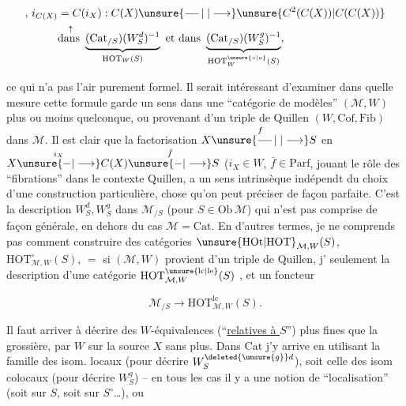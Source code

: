 \[
\begin{aligned}
,\,i_{C(X)}&=C(i_X):C(X)\unsure{\mathrel{\relbar\joinrel\relbar\joinrel\vert}|\longrightarrow}\unsure{C^2(C(X))|C(C(X))}\\
&\overset{\uparrow}{\text{dans }}\underbrace{(\mathrm{Cat}_{/S})(W_S^d)^{-1}}_{\mathrm{HOT}_W(S)}
 \text{ et dans }\underbrace{(\mathrm{Cat}_{/S})(W_S^g)^{-1}}_{\mathrm{HOT}_W^{\unsure{\circ|o}}(S)},
\end{aligned}
\]

ce qui n'a pas l'air purement formel.  Il serait intéressant d'examiner dans quelle mesure   cette formule garde un sens  dans une ``catégorie de modèles'' $(\mathcal M,W)$ plus ou moins quelconque,  ou provenant d'un triple de Quillen $(W,\mathrm{Cof},\mathrm{Fib})$ dans $\mathcal M$. Il est clair que la factorisation $X\overset{f}{\unsure{\mathrel{\relbar\joinrel\relbar\joinrel\vert}|\longrightarrow}}S$ en $X\overset{i_X}{\unsure{-|\longrightarrow}}C(X)\overset{\bar f}{\unsure{-|\longrightarrow}}S$ ($i_X\in W$, $\bar f\in\mathrm{Parf}$, jouant le rôle des ``fibrations'' dans le contexte Quillen, a un sens intrinsèque indépendt du choix d'une construction particulière, chose qu'on peut préciser de façon parfaite. C'est la  description  $W_S^d,W_S^g$ dans $\mathcal M_{/S}$ (pour $S\in\mathrm{Ob}\,\mathcal M$) qui n'est pas comprise de façon générale, en dehors du cas $\mathcal M=\mathrm{Cat}$. En d'autres termes, je ne comprends pas comment construire des catégories $\mathrm{\unsure{HOt|HOT}}_{\mathcal M,W}(S)$, $\mathrm{HOT}_{\mathcal M,W}^{\circ}(S)$, $=$ si $(\mathcal M,W)$ provient d'un triple de Quillen, j'  seulement la description d'une catégorie $\mathrm{HOT}^{\unsure{\mathrm{lc}|\mathrm{le}}}_{\mathcal M,W}(S)$ , et un foncteur 

\[
\mathcal M_{/S}\longrightarrow\mathrm{HOT}_{\mathcal M,W}^{\mathrm{lc}}(S).
\]

Il faut arriver à décrire des  $W$-équivalences (``\uline{relatives à $S$}'') plus fines que la grossière,   par $W$ sur la source $X$ sans plus. Dans $\mathrm{Cat}$ j'y arrive en utilisant  la famille des isom. locaux (pour décrire $W_S^{\deleted{\unsure{g}}d}$), soit celle des isom colocaux (pour décrire $W_S^g$) -- en tous les cas il y a une notion de ``localisation'' (soit sur $S$, soit sur $S^\circ$\ldots), ou


